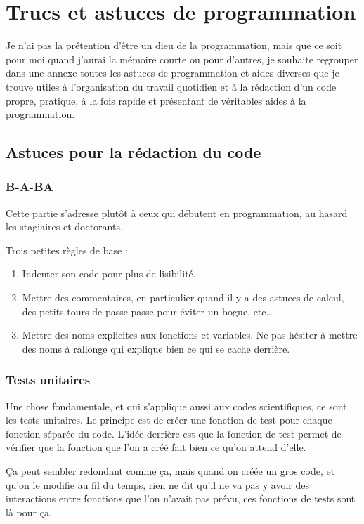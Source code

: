 \chapter{Trucs et astuces de programmation}
Je n'ai pas la prétention d'être un dieu de la programmation, mais que ce soit pour moi quand j'aurai la mémoire courte ou pour d'autres, je souhaite regrouper dans une annexe toutes les astuces de programmation et aides diverses que je trouve utiles à l'organisation du travail quotidien et à la rédaction d'un code propre, pratique, à la fois rapide et présentant de véritables aides à la programmation. 


\section{Astuces pour la rédaction du code}
\subsection{B-A-BA}
Cette partie s'adresse plutôt à ceux qui débutent en programmation, au hasard les stagiaires et doctorants. 

Trois petites règles de base : 
\begin{enumerate}
\item Indenter son code pour plus de lisibilité.
\item Mettre des commentaires, en particulier quand il y a des astuces de calcul, des petits tours de passe passe pour éviter un bogue, etc\dots
\item Mettre des noms explicites aux fonctions et variables. Ne pas hésiter à mettre des noms à rallonge qui explique bien ce qui se cache derrière. 
\end{enumerate}

\subsection{Tests unitaires}
Une chose fondamentale, et qui s'applique aussi aux codes scientifiques, ce sont les tests unitaires. Le principe est de créer une fonction de test pour chaque fonction séparée du code. L'idée derrière est que la fonction de test permet de vérifier que la fonction que l'on a créé fait bien ce qu'on attend d'elle. 

Ça peut sembler redondant comme ça, mais quand on créée un gros code, et qu'on le modifie au fil du temps, rien ne dit qu'il ne va pas y avoir des interactions entre fonctions que l'on n'avait pas prévu, ces fonctions de tests sont là pour ça. 

